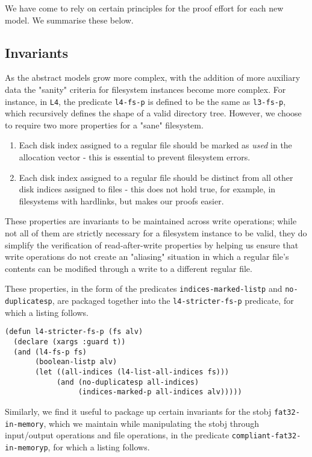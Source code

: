 \documentclass[submission,copyright,creativecommons]{eptcs}
\begin{document}
We have come to rely on certain principles for the proof effort for
each new model. We summarise these below.

\subsection{Invariants}

As the abstract models grow more complex, with the addition of more
auxiliary data the "sanity" criteria for filesystem instances become more
complex. For instance, in \texttt{L4}, the predicate \texttt{l4-fs-p}
is defined to be the same as \texttt{l3-fs-p}, which recursively
defines the shape of a valid directory tree. However, we choose to
require two more properties for a "sane" filesystem.

\begin{enumerate}
\item Each disk index assigned to a regular file should be
  marked as \textit{used} in the allocation vector - this is essential
  to prevent filesystem errors.
\item Each disk index assigned to a regular file should be distinct
  from all other disk indices assigned to files - this does not hold
  true, for example, in filesystems with hardlinks, but makes our
  proofs easier.
\end{enumerate}

These properties are invariants to be maintained across
write operations; while not all of them are strictly necessary for a
filesystem instance to be valid, they do simplify the verification of
read-after-write properties by helping us ensure that write operations
do not create an "aliasing" situation in which a regular file's
contents can be modified through a write to a different regular file.

These properties, in the form of the predicates
\texttt{indices-marked-listp} and \texttt{no-duplicatesp}, are
packaged together into the \texttt{l4-stricter-fs-p} predicate, for
which a listing follows.

\medskip

\noindent
\begin{verbatim}
(defun l4-stricter-fs-p (fs alv)
  (declare (xargs :guard t))
  (and (l4-fs-p fs)
       (boolean-listp alv)
       (let ((all-indices (l4-list-all-indices fs)))
            (and (no-duplicatesp all-indices)
                 (indices-marked-p all-indices alv)))))
\end{verbatim}

Similarly, we find it useful to package up certain invariants for the
stobj \texttt{fat32-in-memory}, which we maintain while
manipulating the stobj through input/output operations and file
operations, in the predicate \texttt{compliant-fat32-in-memoryp}, for
which a listing follows.
\end{document}
